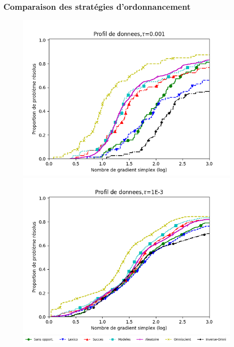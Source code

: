 \documentclass{beamer}
\begin{document}
\begin{frame}
\frametitle{Comparaison des stratégies d'ordonnancement}
\noindent
\begin{center}
\begin{figure}
\vspace{-1em}
\begin{minipage}[t]{0.5\linewidth}
\includegraphics[width=\linewidth]{cog.png}
\end{minipage}%
\hfill%
\begin{minipage}[t]{0.5\linewidth}
\includegraphics[width=\linewidth]{mog.png}
\end{minipage}
\includegraphics[width=\linewidth]{legende_mw.png}

\end{figure}
\end{center}
\end{frame}
\end{document}
